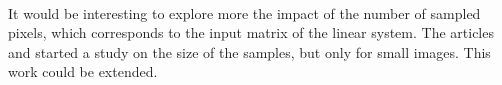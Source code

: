 \paragraph{}
It would be interesting to explore more the impact of the number of sampled pixels, which corresponds to the input matrix of the linear system.
The articles \cite{fowlkes_spectral_2004} and \cite{glide_2014} started a study on the size of the samples, but only for small images.
This work could be extended.
